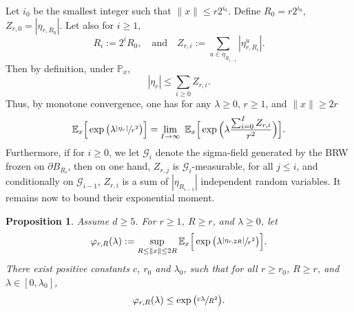 \documentclass[JEP,XML,SOM,Unicode,NoFloatCountersInSection,published]{cedram}
\theoremstyle{plain}
\newtheorem{proposition}[theorem]{Proposition}
\theoremstyle{definition}
\newcommand{\1}{{\text{\Large $\mathfrak 1$}}}
\begin{document}
Let $i_0$ be the smallest integer such that $\|x\|\le r2^{i_0}$.
Define $R_0 = r2^{i_0}$, $Z_{r,0}=|\eta_{r,R_0}|$. Let also for $i\ge 1$,
\begin{equation}\label{def-R}
R_i := 2^{i}R_0,\quad\text{and}\quad
Z_{r,i}:= \sum_{u\in \eta_{R_{i-1}} } |\eta^u_{r,R_i}|.
\end{equation}
Then by definition, under $\mathbb P_x$,
\begin{equation*}
|\eta_r| \le \sum_{i\ge 0} Z_{r,i}.
\end{equation*}
Thus, by monotone convergence, one has for any $\lambda\ge 0$, $r\ge 1$,
and $\|x\|\ge 2r$
\begin{equation}\label{link.etar.etari}
\mathbb E_x \Big[\exp\big(\lambda\sfrac{|\eta_r|}{r^2}\big)\Big]
=\lim_{I\to \infty} \ \mathbb E_x\Big[\exp\Big(\lambda\frac{\sum_{i=0}^I
Z_{r,i}}{r^2}\Big)\Big].
\end{equation}
Furthermore, if for $i\ge 0$, we let $\mathcal G_i$ denote the sigma-field
generated by the BRW frozen on $\partial B_{R_i}$, then
on one hand, $Z_{r,j}$ is $\mathcal G_i$-measurable, for all $j\le i$,
and conditionally on $\mathcal G_{i-1}$, $Z_{r,i}$
is a sum of $|\eta_{R_{i-1}}|$
independent random variables.
It remains now to bound their exponential moment.

\begin{proposition}\label{prop.phi.i}
Assume $d\ge 5$. For $r\ge 1$, $R\ge r$, and $\lambda\ge 0$, let
\begin{equation*}
\varphi_{r,R}(\lambda) := \sup_{R\le \|x\|\le 2R}
\mathbb E_x\Big[\exp\big(\lambda\sfrac{|\eta_{r,2R}|}{r^2}\big)\Big].
\end{equation*}
There exist positive constants $c$, $r_0$ and $\lambda_0$, such that for all $r\ge r_0$, $R\ge r$, and $\lambda\in[0,\lambda_0]$,
\begin{equation*}%
\varphi_{r,R}(\lambda) \le \exp\big(\sfrac{c\lambda}{R^2}\big).
\end{equation*}
\end{proposition}
\end{document}
